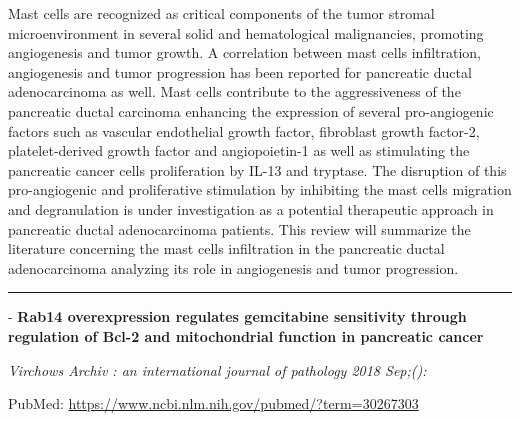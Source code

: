 \documentclass[]{article}
\begin{document}
Mast cells are recognized as critical components of the tumor stromal
microenvironment in several solid and hematological malignancies,
promoting angiogenesis and tumor growth. A correlation between mast
cells infiltration, angiogenesis and tumor progression has been reported
for pancreatic ductal adenocarcinoma as well. Mast cells contribute to
the aggressiveness of the pancreatic ductal carcinoma enhancing the
expression of several pro-angiogenic factors such as vascular
endothelial growth factor, fibroblast growth factor-2, platelet-derived
growth factor and angiopoietin-1 as well as stimulating the pancreatic
cancer cells proliferation by IL-13 and tryptase. The disruption of this
pro-angiogenic and proliferative stimulation by inhibiting the mast
cells migration and degranulation is under investigation as a potential
therapeutic approach in pancreatic ductal adenocarcinoma patients. This
review will summarize the literature concerning the mast cells
infiltration in the pancreatic ductal adenocarcinoma analyzing its role
in angiogenesis and tumor progression.

{}

{}

\begin{center}\rule{0.5\linewidth}{\linethickness}\end{center}

 - \textbf{Rab14 overexpression regulates gemcitabine sensitivity
through regulation of Bcl-2 and mitochondrial function in pancreatic
cancer}

\emph{Virchows Archiv : an international journal of pathology 2018
Sep;():}

PubMed: \url{https://www.ncbi.nlm.nih.gov/pubmed/?term=30267303}
\end{document}
